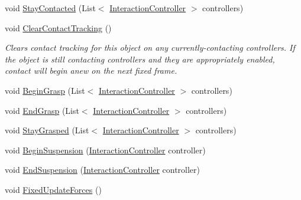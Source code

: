 \begin{DoxyCompactItemize}
\item 
void \mbox{\hyperlink{class_leap_1_1_unity_1_1_interaction_1_1_interaction_behaviour_a436494ab292bc5f759194d5ea68e077c}{Stay\+Contacted}} (List$<$ \mbox{\hyperlink{class_leap_1_1_unity_1_1_interaction_1_1_interaction_controller}{Interaction\+Controller}} $>$ controllers)
\item 
void \mbox{\hyperlink{class_leap_1_1_unity_1_1_interaction_1_1_interaction_behaviour_a79cebc9b1c8aa1296fd362c92a31ee05}{Clear\+Contact\+Tracking}} ()
\begin{DoxyCompactList}\small\item\em Clears contact tracking for this object on any currently-\/contacting controllers. If the object is still contacting controllers and they are appropriately enabled, contact will begin anew on the next fixed frame. \end{DoxyCompactList}\item 
void \mbox{\hyperlink{class_leap_1_1_unity_1_1_interaction_1_1_interaction_behaviour_a96eca43283dfd825136e35345a4519f4}{Begin\+Grasp}} (List$<$ \mbox{\hyperlink{class_leap_1_1_unity_1_1_interaction_1_1_interaction_controller}{Interaction\+Controller}} $>$ controllers)
\item 
void \mbox{\hyperlink{class_leap_1_1_unity_1_1_interaction_1_1_interaction_behaviour_a64b36a1d5314d1befc47447f8a3e46f9}{End\+Grasp}} (List$<$ \mbox{\hyperlink{class_leap_1_1_unity_1_1_interaction_1_1_interaction_controller}{Interaction\+Controller}} $>$ controllers)
\item 
void \mbox{\hyperlink{class_leap_1_1_unity_1_1_interaction_1_1_interaction_behaviour_a47f9dce836cf928f2cb6885547f7afa8}{Stay\+Grasped}} (List$<$ \mbox{\hyperlink{class_leap_1_1_unity_1_1_interaction_1_1_interaction_controller}{Interaction\+Controller}} $>$ controllers)
\item 
void \mbox{\hyperlink{class_leap_1_1_unity_1_1_interaction_1_1_interaction_behaviour_a31664a1bceac985662d8ed4796af5250}{Begin\+Suspension}} (\mbox{\hyperlink{class_leap_1_1_unity_1_1_interaction_1_1_interaction_controller}{Interaction\+Controller}} controller)
\item 
void \mbox{\hyperlink{class_leap_1_1_unity_1_1_interaction_1_1_interaction_behaviour_a9ebdb659bd6a549e89a523771458244d}{End\+Suspension}} (\mbox{\hyperlink{class_leap_1_1_unity_1_1_interaction_1_1_interaction_controller}{Interaction\+Controller}} controller)
\item 
void \mbox{\hyperlink{class_leap_1_1_unity_1_1_interaction_1_1_interaction_behaviour_aa6c35ef7558084f29e77ebe9e0088d85}{Fixed\+Update\+Forces}} ()

\end{DoxyCompactItemize}
